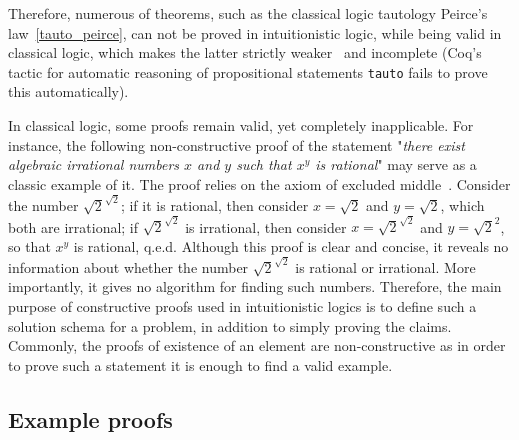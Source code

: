 \documentclass[article]{aaltoseries}
\begin{document}
Therefore, numerous of theorems, such as the classical logic tautology Peirce's law~\eqref{tauto_peirce}, can not be proved in intuitionistic logic, while being valid in classical logic, which makes the latter strictly weaker~\cite{Rush14} and incomplete (Coq's tactic for automatic reasoning of propositional statements \texttt{tauto} fails to prove this automatically).

In classical logic, some proofs remain valid, yet completely inapplicable. For instance, the following non-constructive proof of the statement "\textit{there exist algebraic irrational numbers $x$ and $y$ such that $x^y$ is rational}" may serve as a classic example of it.
The proof relies on the axiom of excluded middle~\cite{Harrison09}. Consider the number $\sqrt{2}^{\sqrt{2}}$; if it is rational, then consider $x = \sqrt{2}$ and $y = \sqrt{2}$, which both are irrational; if $\sqrt{2}^{\sqrt{2}}$ is irrational, then consider $x = \sqrt{2}^{\sqrt{2}}$ and $y = \sqrt{2}^{2}$, so that $x^{y}$ is rational, q.e.d. Although this proof is clear and concise, it reveals no information about whether the number $\sqrt{2}^{\sqrt{2}}$ is rational or irrational. More importantly, it gives no algorithm for finding such numbers. Therefore, the main purpose of constructive proofs used in intuitionistic logics is to define such a solution schema for a problem, in addition to simply proving the claims.
Commonly, the proofs of existence of an element are non-constructive as in order to prove such a statement it is enough to find a valid example.





\subsection{Example proofs}
\end{document}
